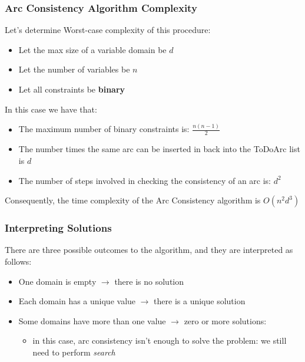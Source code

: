\documentclass{article}
\def\blu#1{{\color{blu}#1}}
\def\red#1{{\color{red}#1}}
\theoremstyle{definition}
\begin{document}
\subsubsection*{Arc Consistency Algorithm Complexity}
Let’s determine Worst-case complexity of this procedure:
\begin{itemize}
	\item Let the \blu{max size of a variable domain} be $ d $
	\item Let the \blu{number of variables} be $ n $
	\item Let all constraints be \textbf{\blu{binary}}
\end{itemize}
In this case we have that:
\begin{itemize}
	\item The maximum number of binary constraints is: $ \frac{n(n-1)}{2} $
	\item The number times the same arc can be inserted in back into the ToDoArc list is $ d $
	\item The number of steps involved in checking the consistency of an arc is: $ d^2 $
\end{itemize}
Consequently, the time complexity of the Arc Consistency algorithm is $ O(n^2d^3) $

\subsubsection*{Interpreting Solutions}
There are three possible outcomes to the algorithm, and they are interpreted as follows:
\begin{itemize}
	\item One domain is empty $ \rightarrow $ there is no solution
	\item Each domain has a unique value $\rightarrow$ there is a unique solution
	\item Some domains have more than one value $\rightarrow$ \red{zero or more solutions}:
	\begin{itemize}
		\item in this case, arc consistency isn't enough to solve the problem: we still need to perform \textit{search}
	\end{itemize}
\end{itemize}
\end{document}
